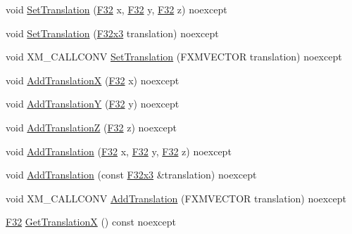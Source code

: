 \begin{DoxyCompactItemize}
\item 
void \mbox{\hyperlink{classmage_1_1_transform_afb794877f9b538b5ce4b55e4cd8852f0}{Set\+Translation}} (\mbox{\hyperlink{namespacemage_aa97e833b45f06d60a0a9c4fc22ae02c0}{F32}} x, \mbox{\hyperlink{namespacemage_aa97e833b45f06d60a0a9c4fc22ae02c0}{F32}} y, \mbox{\hyperlink{namespacemage_aa97e833b45f06d60a0a9c4fc22ae02c0}{F32}} z) noexcept
\item 
void \mbox{\hyperlink{classmage_1_1_transform_a50f037f902afa811b596f745de5537fb}{Set\+Translation}} (\mbox{\hyperlink{namespacemage_a1e3c7a882af461f161caa1cbddaf1fa2}{F32x3}} translation) noexcept
\item 
void X\+M\+\_\+\+C\+A\+L\+L\+C\+O\+NV \mbox{\hyperlink{classmage_1_1_transform_a0c93ec5483091d4be508e11d5c05579e}{Set\+Translation}} (F\+X\+M\+V\+E\+C\+T\+OR translation) noexcept
\item 
void \mbox{\hyperlink{classmage_1_1_transform_a1161f8c965e071dd59f1780d7a06952b}{Add\+TranslationX}} (\mbox{\hyperlink{namespacemage_aa97e833b45f06d60a0a9c4fc22ae02c0}{F32}} x) noexcept
\item 
void \mbox{\hyperlink{classmage_1_1_transform_abf9253ddafad2725ef6c6e2b4bd44b35}{Add\+TranslationY}} (\mbox{\hyperlink{namespacemage_aa97e833b45f06d60a0a9c4fc22ae02c0}{F32}} y) noexcept
\item 
void \mbox{\hyperlink{classmage_1_1_transform_a2554a3af167bb8ae9f4724921e6a3596}{Add\+TranslationZ}} (\mbox{\hyperlink{namespacemage_aa97e833b45f06d60a0a9c4fc22ae02c0}{F32}} z) noexcept
\item 
void \mbox{\hyperlink{classmage_1_1_transform_ae786c4135de007be509b5d5fe9d1a60b}{Add\+Translation}} (\mbox{\hyperlink{namespacemage_aa97e833b45f06d60a0a9c4fc22ae02c0}{F32}} x, \mbox{\hyperlink{namespacemage_aa97e833b45f06d60a0a9c4fc22ae02c0}{F32}} y, \mbox{\hyperlink{namespacemage_aa97e833b45f06d60a0a9c4fc22ae02c0}{F32}} z) noexcept
\item 
void \mbox{\hyperlink{classmage_1_1_transform_a971fd7417705ccf2f702c47d3a6c5bcb}{Add\+Translation}} (const \mbox{\hyperlink{namespacemage_a1e3c7a882af461f161caa1cbddaf1fa2}{F32x3}} \&translation) noexcept
\item 
void X\+M\+\_\+\+C\+A\+L\+L\+C\+O\+NV \mbox{\hyperlink{classmage_1_1_transform_a931911a2ef61b9a74be444e4c65ee46a}{Add\+Translation}} (F\+X\+M\+V\+E\+C\+T\+OR translation) noexcept
\item 
\mbox{\hyperlink{namespacemage_aa97e833b45f06d60a0a9c4fc22ae02c0}{F32}} \mbox{\hyperlink{classmage_1_1_transform_a90b2c059a45964bf4de816a4b7e6c55c}{Get\+TranslationX}} () const noexcept

\end{DoxyCompactItemize}
